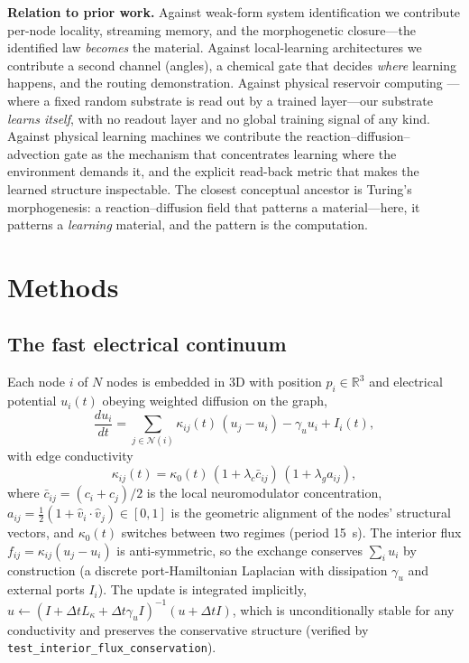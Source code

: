 \documentclass[11pt]{article}
\begin{document}
\textbf{Relation to prior work.} Against weak-form system
identification\cite{WSINDy21,OWSINDy22} we contribute per-node locality, streaming
memory, and the morphogenetic closure---the identified law \emph{becomes} the material.
Against local-learning architectures\cite{EP17,DNI17,RB99,FF22,KH19} we contribute a
second channel (angles), a chemical gate that decides \emph{where} learning happens,
and the routing demonstration. Against physical reservoir computing\cite{Tanaka19,Jaeger01,Maass02}
---where a fixed random substrate is read out by a trained layer---our substrate
\emph{learns itself}, with no readout layer and no global training signal of any kind.
Against physical learning machines\cite{Stern21,MN24} we contribute the
reaction--diffusion--advection gate as the mechanism that concentrates learning where
the environment demands it, and the explicit read-back metric that makes the learned
structure inspectable. The closest conceptual ancestor is Turing's
morphogenesis\cite{Turing52}: a reaction--diffusion field that patterns a
material---here, it patterns a \emph{learning} material, and the pattern is the
computation.

\section{Methods}
\subsection{The fast electrical continuum}
Each node $i$ of $N$ nodes is embedded in 3D with position $p_i \in \mathbb{R}^3$ and
electrical potential $u_i(t)$ obeying weighted diffusion on the graph,
\begin{equation}
\frac{du_i}{dt} = \sum_{j \in \mathcal{N}(i)} \kappa_{ij}(t)\,(u_j - u_i)
- \gamma_u u_i + I_i(t),
\end{equation}
with edge conductivity
\begin{equation}
\kappa_{ij}(t) = \kappa_0(t)\,(1 + \lambda_c \bar c_{ij})\,(1 + \lambda_g a_{ij}),
\end{equation}
where $\bar c_{ij} = (c_i + c_j)/2$ is the local neuromodulator concentration,
$a_{ij} = \tfrac{1}{2}(1 + \hat v_i \cdot \hat v_j) \in [0,1]$ is the geometric alignment
of the nodes' structural vectors, and $\kappa_0(t)$ switches between two regimes (period
15~s). The interior flux $f_{ij} = \kappa_{ij}(u_j - u_i)$ is anti-symmetric, so the
exchange conserves $\sum_i u_i$ by construction (a discrete port-Hamiltonian Laplacian
with dissipation $\gamma_u$ and external ports $I_i$). The update is integrated
implicitly,
$u \leftarrow (I + \Delta t L_\kappa + \Delta t \gamma_u I)^{-1}(u + \Delta t I)$,
which is unconditionally stable for any conductivity and preserves the conservative
structure (verified by \texttt{test\_interior\_flux\_conservation}).
\end{document}

